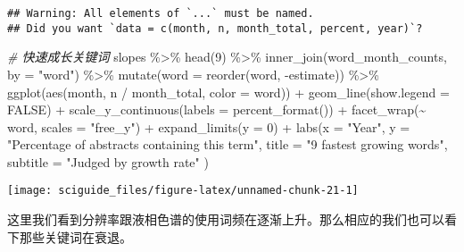 \documentclass[]{tufte-book}
\newenvironment{Shaded}{}{}
\newcommand{\AttributeTok}[1]{\textcolor[rgb]{0.49,0.56,0.16}{#1}}
\newcommand{\CommentTok}[1]{\textcolor[rgb]{0.38,0.63,0.69}{\textit{#1}}}
\newcommand{\ConstantTok}[1]{\textcolor[rgb]{0.53,0.00,0.00}{#1}}
\newcommand{\DecValTok}[1]{\textcolor[rgb]{0.25,0.63,0.44}{#1}}
\newcommand{\FunctionTok}[1]{\textcolor[rgb]{0.02,0.16,0.49}{#1}}
\newcommand{\NormalTok}[1]{#1}
\newcommand{\SpecialCharTok}[1]{\textcolor[rgb]{0.25,0.44,0.63}{#1}}
\newcommand{\StringTok}[1]{\textcolor[rgb]{0.25,0.44,0.63}{#1}}
\begin{document}
\begin{verbatim}
## Warning: All elements of `...` must be named.
## Did you want `data = c(month, n, month_total, percent, year)`?
\end{verbatim}

\begin{Shaded}
\begin{Highlighting}[]
\CommentTok{\# 快速成长关键词}
\NormalTok{slopes }\SpecialCharTok{\%\textgreater{}\%}
  \FunctionTok{head}\NormalTok{(}\DecValTok{9}\NormalTok{) }\SpecialCharTok{\%\textgreater{}\%}
  \FunctionTok{inner\_join}\NormalTok{(word\_month\_counts, }\AttributeTok{by =} \StringTok{"word"}\NormalTok{) }\SpecialCharTok{\%\textgreater{}\%}
  \FunctionTok{mutate}\NormalTok{(}\AttributeTok{word =} \FunctionTok{reorder}\NormalTok{(word, }\SpecialCharTok{{-}}\NormalTok{estimate)) }\SpecialCharTok{\%\textgreater{}\%}
  \FunctionTok{ggplot}\NormalTok{(}\FunctionTok{aes}\NormalTok{(month, n }\SpecialCharTok{/}\NormalTok{ month\_total, }\AttributeTok{color =}\NormalTok{ word)) }\SpecialCharTok{+}
  \FunctionTok{geom\_line}\NormalTok{(}\AttributeTok{show.legend =} \ConstantTok{FALSE}\NormalTok{) }\SpecialCharTok{+}
  \FunctionTok{scale\_y\_continuous}\NormalTok{(}\AttributeTok{labels =} \FunctionTok{percent\_format}\NormalTok{()) }\SpecialCharTok{+}
  \FunctionTok{facet\_wrap}\NormalTok{(}\SpecialCharTok{\textasciitilde{}}\NormalTok{ word, }\AttributeTok{scales =} \StringTok{"free\_y"}\NormalTok{) }\SpecialCharTok{+}
  \FunctionTok{expand\_limits}\NormalTok{(}\AttributeTok{y =} \DecValTok{0}\NormalTok{) }\SpecialCharTok{+}
  \FunctionTok{labs}\NormalTok{(}\AttributeTok{x =} \StringTok{"Year"}\NormalTok{,}
       \AttributeTok{y =} \StringTok{"Percentage of abstracts containing this term"}\NormalTok{,}
       \AttributeTok{title =} \StringTok{"9 fastest growing words"}\NormalTok{,}
       \AttributeTok{subtitle =} \StringTok{"Judged by growth rate"}
\NormalTok{              )}
\end{Highlighting}
\end{Shaded}

\texttt{[image: sciguide\_files/figure-latex/unnamed-chunk-21-1]}

这里我们看到分辨率跟液相色谱的使用词频在逐渐上升。那么相应的我们也可以看下那些关键词在衰退。
\end{document}
